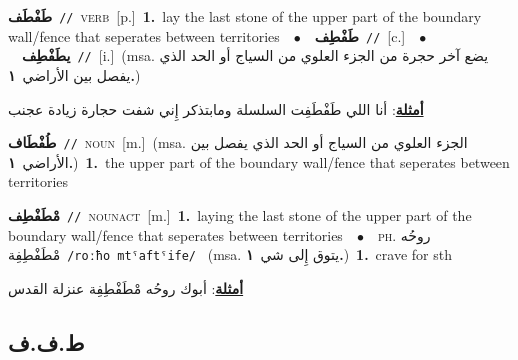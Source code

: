 \documentclass[10pt,a4paper,twoside]{article} %
\begin{document}
\begin{multicols}{2}
{\setlength\topsep{0pt}\textbf{\foreignlanguage{arabic}{طَفْطَف}}\ {\color{gray}\texttt{//}\color{black}}\ \textsc{verb}\ [p.]\ \textbf{1.}~lay the last stone of the upper part of the boundary wall/fence that seperates between territories\ \ $\bullet$\ \ \setlength\topsep{0pt}\textbf{\foreignlanguage{arabic}{طَفْطِف}}\ {\color{gray}\texttt{//}\color{black}}\ [c.]\ \ $\bullet$\ \ \setlength\topsep{0pt}\textbf{\foreignlanguage{arabic}{يطَفْطِف}}\ {\color{gray}\texttt{//}\color{black}}\ [i.]\ \color{gray}(msa. \foreignlanguage{arabic}{يضع آخر حجرة من الجزء العلوي من السياج أو الحد الذي يفصل بين الأراضي}~\foreignlanguage{arabic}{\textbf{١.}})\color{black}\  \begin{flushright}\color{gray}\foreignlanguage{arabic}{\textbf{\underline{\foreignlanguage{arabic}{أمثلة}}}: أنا اللي طَفْطَفِت السلسلة ومابتذكر إِني شفت حجارة زيادة عجنب}\end{flushright}\color{black}} \vspace{2mm}

{\setlength\topsep{0pt}\textbf{\foreignlanguage{arabic}{طُفْطَاف}}\ {\color{gray}\texttt{//}\color{black}}\ \textsc{noun}\ [m.]\ \color{gray}(msa. \foreignlanguage{arabic}{الجزء العلوي من السياج أو الحد الذي يفصل بين الأراضي}~\foreignlanguage{arabic}{\textbf{١.}})\color{black}\ \textbf{1.}~the upper part of the boundary wall/fence that seperates between territories\ } \vspace{2mm}

{\setlength\topsep{0pt}\textbf{\foreignlanguage{arabic}{مْطَفْطِف}}\ {\color{gray}\texttt{//}\color{black}}\ \textsc{noun\textunderscore act}\ [m.]\ \textbf{1.}~laying the last stone of the upper part of the boundary wall/fence that seperates between territories\ \ $\bullet$\ \ \textsc{ph.} \color{gray} \foreignlanguage{arabic}{روحُه مْطَفْطِفِة}\color{black}\ {\color{gray}\texttt{/{\sffamily roːħo mtˤaftˤife}/}\color{black}}\ \color{gray} (msa. \foreignlanguage{arabic}{يتوق إِلى شي}~\foreignlanguage{arabic}{\textbf{١.}})\color{black}\ \textbf{1.}~crave for sth\  \begin{flushright}\color{gray}\foreignlanguage{arabic}{\textbf{\underline{\foreignlanguage{arabic}{أمثلة}}}: أبوك روحُه مْطَفْطِفِة عنزلة القدس}\end{flushright}\color{black}} \vspace{2mm}

\vspace{-3mm}
\subsection*{\color{blue}\foreignlanguage{arabic}{ط.ف.ف}\color{blue}{}} 


\end{multicols}
\end{document}
